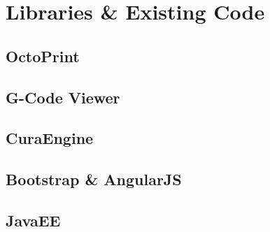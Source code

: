 \chapter{Libraries \& Existing Code}

\section{OctoPrint}
\section{G-Code Viewer}
\section{CuraEngine}
\section{Bootstrap \& AngularJS}
\section{JavaEE}
